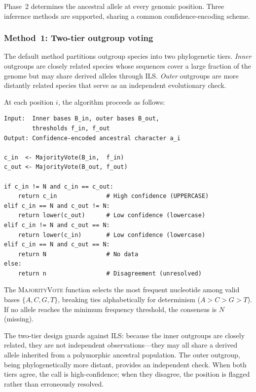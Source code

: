 \documentclass[11pt,a4paper]{article}
\begin{document}
Phase~2 determines the ancestral allele at every genomic position. Three
inference methods are supported, sharing a common confidence-encoding scheme.

\subsubsection{Method~1: Two-tier outgroup voting}
\label{sec:voting}

The default method partitions outgroup species into two phylogenetic tiers.
\emph{Inner} outgroups are closely related species whose sequences cover a
large fraction of the genome but may share derived alleles through ILS.
\emph{Outer} outgroups are more distantly related species that serve as an
independent evolutionary check.

At each position $i$, the algorithm proceeds as follows:

\begin{lstlisting}[caption={Two-tier outgroup voting (pseudocode).},
label={alg:voting},language={},numbers=none,frame=single,
basicstyle=\ttfamily\small]
Input:  Inner bases B_in, outer bases B_out,
        thresholds f_in, f_out
Output: Confidence-encoded ancestral character a_i

c_in  <- MajorityVote(B_in,  f_in)
c_out <- MajorityVote(B_out, f_out)

if c_in != N and c_in == c_out:
    return c_in              # High confidence (UPPERCASE)
elif c_in == N and c_out != N:
    return lower(c_out)      # Low confidence (lowercase)
elif c_in != N and c_out == N:
    return lower(c_in)       # Low confidence (lowercase)
elif c_in == N and c_out == N:
    return N                 # No data
else:
    return n                 # Disagreement (unresolved)
\end{lstlisting}

The \textsc{MajorityVote} function selects the most frequent nucleotide
among valid bases $\{A, C, G, T\}$, breaking ties alphabetically for
determinism ($A > C > G > T$). If no allele reaches the minimum frequency
threshold, the consensus is $N$ (missing).

The two-tier design guards against ILS: because the inner outgroups are
closely related, they are not independent observations---they may all share
a derived allele inherited from a polymorphic ancestral population. The outer
outgroup, being phylogenetically more distant, provides an independent check.
When both tiers agree, the call is high-confidence; when they disagree, the
position is flagged rather than erroneously resolved.
\end{document}

